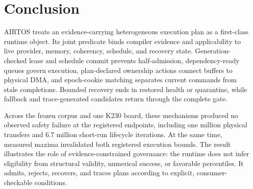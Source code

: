 \documentclass[lettersize,journal]{IEEEtran}
\begin{document}
\section{Conclusion}
AIRTOS treats an evidence-carrying heterogeneous execution plan as a
first-class runtime object. Its joint predicate binds compiler evidence and
applicability to live provider, memory, coherency, schedule, and recovery
state. Generation-checked lease and schedule commit prevents half-admission,
dependency-ready queues govern execution, plan-declared ownership actions
connect buffers to physical DMA, and epoch-cookie matching separates current
commands from stale completions. Bounded recovery ends in restored health or
quarantine, while fallback and trace-generated candidates return through the
complete gate.

Across the frozen corpus and one K230 board, these mechanisms produced no
observed safety failure at the registered endpoints, including one million
physical transfers and 6.7 million short-run lifecycle iterations. At the same
time, measured maxima invalidated both registered execution bounds. The result
illustrates the role of evidence-constrained governance: the runtime does not
infer eligibility from structural validity, numerical success, or favorable
percentiles. It admits, rejects, recovers, and traces plans according to
explicit, consumer-checkable conditions.
\end{document}
